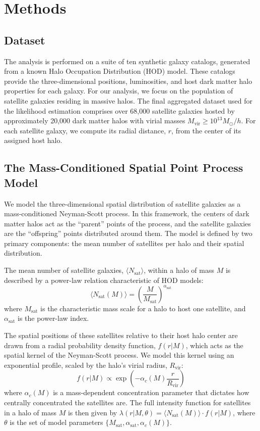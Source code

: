 \documentclass[]{article}
\begin{document}
\section{Methods}
\label{sec:methods}
\subsection{Dataset}
The analysis is performed on a suite of ten synthetic galaxy catalogs, generated from a known Halo Occupation Distribution (HOD) model. These catalogs provide the three-dimensional positions, luminosities, and host dark matter halo properties for each galaxy. For our analysis, we focus on the population of satellite galaxies residing in massive halos. The final aggregated dataset used for the likelihood estimation comprises over 68,000 satellite galaxies hosted by approximately 20,000 dark matter halos with virial masses $M_{\text{vir}} \ge 10^{13} M_\odot/h$. For each satellite galaxy, we compute its radial distance, $r$, from the center of its assigned host halo.

\subsection{The Mass-Conditioned Spatial Point Process Model}
We model the three-dimensional spatial distribution of satellite galaxies as a mass-conditioned Neyman-Scott process. In this framework, the centers of dark matter halos act as the ``parent'' points of the process, and the satellite galaxies are the ``offspring'' points distributed around them. The model is defined by two primary components: the mean number of satellites per halo and their spatial distribution.

The mean number of satellite galaxies, $\langle N_{\text{sat}} \rangle$, within a halo of mass $M$ is described by a power-law relation characteristic of HOD models:
\begin{equation}
\langle N_{\text{sat}}(M) \rangle = \left( \frac{M}{M_{\text{sat}}} \right)^{\alpha_{\text{sat}}}
\end{equation}
where $M_{\text{sat}}$ is the characteristic mass scale for a halo to host one satellite, and $\alpha_{\text{sat}}$ is the power-law index.

The spatial positions of these satellites relative to their host halo center are drawn from a radial probability density function, $f(r|M)$, which acts as the spatial kernel of the Neyman-Scott process. We model this kernel using an exponential profile, scaled by the halo's virial radius, $R_{\text{vir}}$:
\begin{equation}
f(r|M) \propto \exp\left(-\alpha_c(M) \frac{r}{R_{\text{vir}}}\right)
\end{equation}
where $\alpha_c(M)$ is a mass-dependent concentration parameter that dictates how centrally concentrated the satellites are. The full intensity function for satellites in a halo of mass $M$ is then given by $\lambda(r | M, \theta) = \langle N_{\text{sat}}(M) \rangle \cdot f(r|M)$, where $\theta$ is the set of model parameters $\{M_{\text{sat}}, \alpha_{\text{sat}}, \alpha_c(M)\}$.
\end{document}
